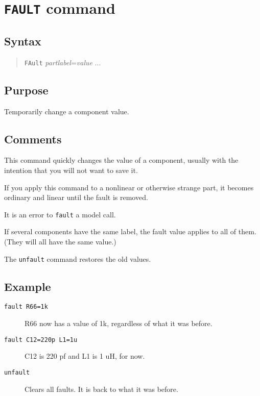 \section{{\tt FAULT} command}
\subsection{Syntax}
\begin{verse}
{\tt FAult} {\it partlabel}={\it value} ...
\end{verse}
\subsection{Purpose}

Temporarily change a component value.
\subsection{Comments}

This command quickly changes the value of a component, usually with the
intention that you will not want to save it.

If you apply this command to a nonlinear or otherwise strange part, it becomes
ordinary and linear until the fault is removed.

It is an error to {\tt fault} a model call.

If several components have the same label, the fault value applies to all of
them.  (They will all have the same value.)

The {\tt unfault} command restores the old values.
\subsection{Example}

\begin{description}

\item[{\tt fault R66=1k}] R66 now has a value of 1k, regardless of what it
was before.

\item[{\tt fault C12=220p L1=1u}] C12 is 220 pf and L1 is 1 uH, for now.

\item[{\tt unfault}] Clears all faults.  It is back to what it was before.

\end{description}
